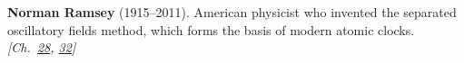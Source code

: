 \nobelphysics \textbf{Norman Ramsey} (1915–2011). American physicist who invented the separated oscillatory fields method, which forms the basis of modern atomic clocks. \emph{[Ch.~\hyperref[ch:negativetemperature]{28}, \hyperref[ch:atomic]{32}]}

